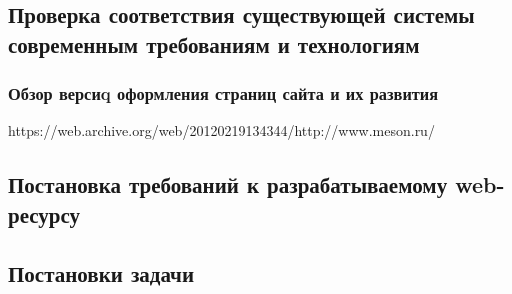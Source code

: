 \subsection{Проверка соответствия существующей системы современным требованиям и технологиям}   %
    \subsubsection{Обзор версиq оформления страниц сайта и их развития}                          %
        https://web.archive.org/web/20120219134344/http://www.meson.ru/

\subsection{Постановка требований к разрабатываемому web-ресурсу}                               %

\subsection{Постановки задачи}                                                                  %

\clearpage
